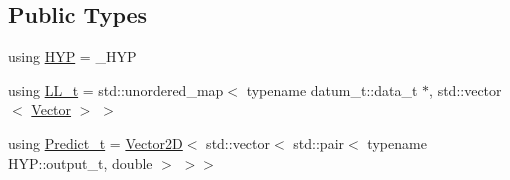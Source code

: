 \subsection*{Public Types}
\begin{DoxyCompactItemize}
\item 
using \hyperlink{class_grammar_hypothesis_a28fc99df28de741179719c94ecd77699}{H\+YP} = \+\_\+\+H\+YP
\item 
using \hyperlink{class_grammar_hypothesis_a7c6a6c59b0ba1ca6e225079d0cb7143b}{L\+L\+\_\+t} = std\+::unordered\+\_\+map$<$ typename datum\+\_\+t\+::data\+\_\+t $\ast$, std\+::vector$<$ \hyperlink{_eigen_lib_8h_aca2956bc379bce2ed88ab3c0e1b61d1d}{Vector} $>$ $>$
\item 
using \hyperlink{class_grammar_hypothesis_aa5ecc4d2215fa50a9c2b4e7c682c7cd7}{Predict\+\_\+t} = \hyperlink{struct_vector2_d}{Vector2D}$<$ std\+::vector$<$ std\+::pair$<$ typename H\+Y\+P\+::output\+\_\+t, double $>$ $>$$>$
\end{DoxyCompactItemize}
